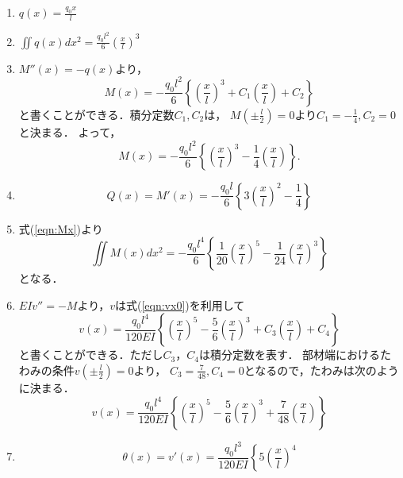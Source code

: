 \documentclass[10pt,a4j]{jarticle}
\begin{document}
\begin{enumerate}
\item
	$q(x)=\frac{q_0x}{l}$
\item
	$\iint q(x)dx^2 =\frac{q_0l^2}{6}\left(\frac{x}{l}\right)^3$
\item
	$M''(x)=-q(x)$より，
	\begin{equation}
		M(x)= 
		-\frac{q_0l^2}{6}
		\left\{	
		\left(\frac{x}{l}\right)^3
		+
		C_1
		\left(\frac{x}{l}\right)
		+
		C_2
		\right\}
	\end{equation}
	と書くことができる．積分定数$C_1,C_2$は，
	$M\left(\pm\frac{l}{2}\right)=0$より$C_1=-\frac{1}{4},C_2=0$と決まる．
	よって，
	\begin{equation}
		M(x)= 
		-\frac{q_0l^2}{6}
		\left\{	
		\left(\frac{x}{l}\right)^3
		-
		\frac{1}{4}	
		\left(\frac{x}{l}\right)
		\right\}.
		\label{eqn:Mx}
	\end{equation}
\item
	\begin{equation}
		Q(x)=M'(x)=-\frac{q_0l}{6} \left\{ 
		3\left(\frac{x}{l}\right)^2
		-
		\frac{1}{4}	
		\right\} 
	\end{equation}
\item
	式(\ref{eqn:Mx})より
	\begin{equation}
		\iint M(x)dx^2
		=
		-\frac{q_0l^4}{6}
		\left\{	
		\frac{1}{20}
		\left(\frac{x}{l}\right)^5
		-
		\frac{1}{24}	
		\left(\frac{x}{l}\right)^3
		\right\}
		\label{eqn:vx0}
	\end{equation}
	となる．
\item
	$EIv''=-M$より，$v$は式(\ref{eqn:vx0})を利用して
	\begin{equation}
		v(x)=\frac{q_0l^4}{120EI}
		\left\{
			\left(\frac{x}{l}\right)^5
			-
			\frac{5}{6}
			\left(\frac{x}{l}\right)^3
			+
			C_3
			\left(\frac{x}{l}\right)
			+
			C_4
		\right\}
	\end{equation}
	と書くことができる．ただし$C_3，C_4$は積分定数を表す．
	部材端におけるたわみの条件$v\left(\pm \frac{l}{2}\right)=0$より，
	$C_3=\frac{7}{48},C_4=0$となるので，たわみは次のように決まる．
	\begin{equation}
		v(x)=\frac{q_0l^4}{120EI}
		\left\{
			\left(\frac{x}{l}\right)^5
			-
			\frac{5}{6}
			\left(\frac{x}{l}\right)^3
			+
			\frac{7}{48}
			\left(\frac{x}{l}\right)
		\right\}
	\end{equation}
\item
	\begin{equation}
		\theta(x)=v'(x)=\frac{q_0l^3}{120EI}
		\left\{
			5
			\left(\frac{x}{l}\right)^4

\end{equation}
\end{enumerate}
\end{document}
